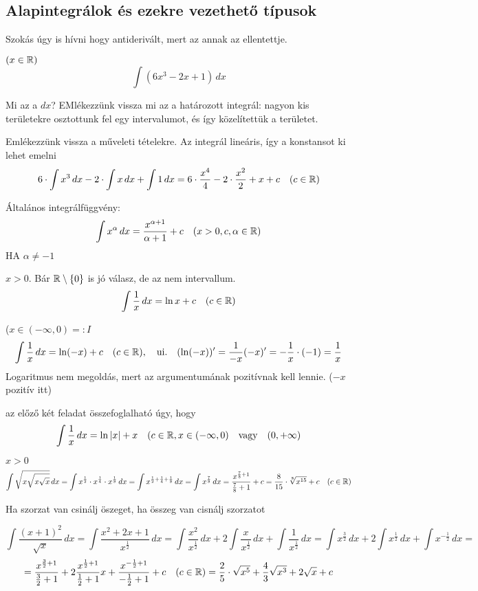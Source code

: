 \documentclass[a4paper,11.5pt]{article}
\begin{document}
	\subsection{Alapintegrálok és ezekre vezethető típusok}
	Szokás úgy is hívni hogy antiderivált, mert az annak az ellentettje.
	\begin{task}$(x\in\mathbb{R})$
		\[\int(6x^3-2x+1)\,dx\]
	\end{task}
	\begin{note}
		Mi az a $dx$? EMlékezzünk vissza mi az a határozott integrál: nagyon kis területekre osztottunk fel egy intervalumot, és így közelítettük a területet.
	\end{note}
	Emlékezzünk vissza a műveleti tételekre. Az integrál lineáris, így a konstansot ki lehet emelni
	\[ 6\cdot\int x^3\,dx-2\cdot\int x\,dx+\int1\,dx=6\cdot\frac{x^4}{4}-2\cdot\frac{x^2}{2}+x+c\quad (c\in\mathbb{R}) \]
	\begin{theorem}
		Általános integrálfüggvény:
		\[ \int x^\alpha\,dx=\frac{x^{\alpha+1}}{\alpha+1}+c\quad (x>0, c,\alpha\in\mathbb{R}) \]
		HA $\alpha\not=-1$
	\end{theorem}
	\begin{task}$x>0$. Bár $\mathbb{R}\setminus\{0\}$ is jó válasz, de az nem intervallum.
		\[ \int\frac{1}{x}\,dx=\ln x+c\quad (c\in\mathbb{R}) \]
	\end{task}
	\begin{task}($x\in(-\infty,0)=:I$
		\[ \int\frac{1}{x}\,dx=\ln(-x)+c\quad (c\in\mathbb{R}),\quad \text{ui.}\quad (\ln(-x))'=\frac{1}{-x}(-x)'=-\frac{1}{x}\cdot(-1)=\frac{1}{x} \]
		Logaritmus nem megoldás, mert az argumentumának pozitívnak kell lennie. ($-x$ pozitív itt)
	\end{task}
	\begin{note}
		az előző két feladat összefoglalható úgy, hogy 
		\[ \int\frac{1}{x}\,dx=\ln|x|+x\quad (c\in\mathbb{R}, x\in(-\infty,0)\quad \text{vagy}\quad (0,+\infty) \]
	\end{note}
	\begin{task}$x>0$
		\[ \int\sqrt{x\sqrt{x\sqrt{x}}}\,dx=\int x^\frac{1}{2}\cdot x^\frac{1}{4}\cdot x^\frac{1}{8}\, dx=\int x^{\frac{1}{2}+\frac{1}{4}+\frac{1}{8}}\,dx=\int x^{\frac{7}{8}}\,dx=\frac{x^{\frac{7}{8}+1}}{\frac{7}{8}+1}+c=\frac{8}{15}\cdot\sqrt[8]{x^{15}}+c\quad (c\in\mathbb{R}) \]
	\end{task}
	\begin{note}
		Ha szorzat van csinálj öszeget, ha összeg van cisnálj szorzatot
	\end{note}
	\begin{task}
		\[ \int\frac{(x+1)^2}{\sqrt{x}}\,dx=\int\frac{x^2+2x+1}{x^\frac{1}{2}}\,dx=\int\frac{x^2}{x^{\frac{1}{2}}}\,dx+2\int\frac{x}{x^\frac{1}{2}}\,dx+\int\frac{1}{x^\frac{1}{2}}\,dx=\int x^\frac{3}{2}\,dx+2\int x^\frac{1}{2}\,dx+\int x^{-\frac{1}{2}}\,dx= \]
		\[=\frac{x^{\frac{3}{2}+1}}{\frac{3}{2}+1}+2\frac{x^{\frac{1}{2}+1}}{\frac{1}{2}+1}x+\frac{x^{-\frac{1}{2}+1}}{-\frac{1}{2}+1}+c\quad (c\in\mathbb{R}) =\frac{2}{5}\cdot\sqrt{x^5}+\frac{4}{3}\sqrt{x^3}+2\sqrt{x}+c \]
	\end{task}
\end{document}

